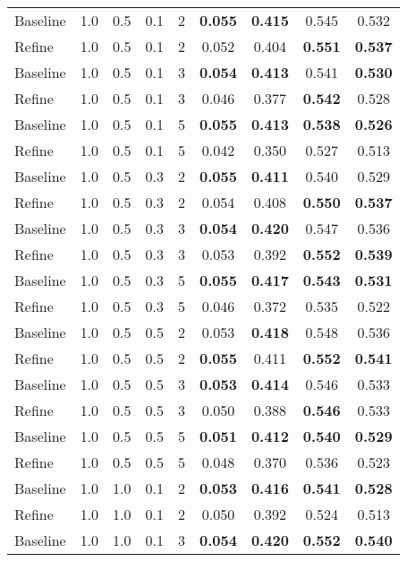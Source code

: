 \documentclass{article}
\begin{document}
\begin{tabular}{lcccccccc}
\hline
Baseline & 1.0 & 0.5 & 0.1 & 2 & \textbf{0.055} & \textbf{0.415} & 0.545 & 0.532 \\
Refine   & 1.0 & 0.5 & 0.1 & 2 & 0.052 & 0.404 & \textbf{0.551} & \textbf{0.537} \\
\hline
Baseline & 1.0 & 0.5 & 0.1 & 3 & \textbf{0.054} & \textbf{0.413} & 0.541 & \textbf{0.530} \\
Refine   & 1.0 & 0.5 & 0.1 & 3 & 0.046 & 0.377 & \textbf{0.542} & 0.528 \\
\hline
Baseline & 1.0 & 0.5 & 0.1 & 5 & \textbf{0.055} & \textbf{0.413} & \textbf{0.538} & \textbf{0.526} \\
Refine   & 1.0 & 0.5 & 0.1 & 5 & 0.042 & 0.350 & 0.527 & 0.513 \\
\hline
Baseline & 1.0 & 0.5 & 0.3 & 2 & \textbf{0.055} & \textbf{0.411} & 0.540 & 0.529 \\
Refine   & 1.0 & 0.5 & 0.3 & 2 & 0.054 & 0.408 & \textbf{0.550} & \textbf{0.537} \\
\hline
Baseline & 1.0 & 0.5 & 0.3 & 3 & \textbf{0.054} & \textbf{0.420} & 0.547 & 0.536 \\
Refine   & 1.0 & 0.5 & 0.3 & 3 & 0.053 & 0.392 & \textbf{0.552} & \textbf{0.539} \\
\hline
Baseline & 1.0 & 0.5 & 0.3 & 5 & \textbf{0.055} & \textbf{0.417} & \textbf{0.543} & \textbf{0.531} \\
Refine   & 1.0 & 0.5 & 0.3 & 5 & 0.046 & 0.372 & 0.535 & 0.522 \\
\hline
Baseline & 1.0 & 0.5 & 0.5 & 2 & 0.053 & \textbf{0.418} & 0.548 & 0.536 \\
Refine   & 1.0 & 0.5 & 0.5 & 2 & \textbf{0.055} & 0.411 & \textbf{0.552} & \textbf{0.541} \\
\hline
Baseline & 1.0 & 0.5 & 0.5 & 3 & \textbf{0.053} & \textbf{0.414} & 0.546 & 0.533 \\
Refine   & 1.0 & 0.5 & 0.5 & 3 & 0.050 & 0.388 & \textbf{0.546} & 0.533 \\
\hline
Baseline & 1.0 & 0.5 & 0.5 & 5 & \textbf{0.051} & \textbf{0.412} & \textbf{0.540} & \textbf{0.529} \\
Refine   & 1.0 & 0.5 & 0.5 & 5 & 0.048 & 0.370 & 0.536 & 0.523 \\
\hline
Baseline & 1.0 & 1.0 & 0.1 & 2 & \textbf{0.053} & \textbf{0.416} & \textbf{0.541} & \textbf{0.528} \\
Refine   & 1.0 & 1.0 & 0.1 & 2 & 0.050 & 0.392 & 0.524 & 0.513 \\
\hline
Baseline & 1.0 & 1.0 & 0.1 & 3 & \textbf{0.054} & \textbf{0.420} & \textbf{0.552} & \textbf{0.540} \\

\end{tabular}
\end{document}
